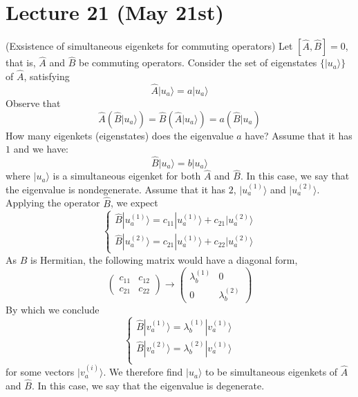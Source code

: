 \section{Lecture 21 (May 21st)}
\begin{thm}
(Exsistence of simultaneous eigenkets for commuting operators) Let $[\hat{A},\hat{B}]=0$, that is, $\hat{A}$ and $\hat{B}$ be commuting operators. Consider the set of eigenstates $\{|u_{a}\rangle \}$ of $\hat{A}$, satisfying
\[\hat{A}|u_{a}\rangle =a|u_{a}\rangle \]
Observe that
\[\hat{A}(\hat{B}|u_{a}\rangle )=\hat{B}(\hat{A}|u_{a}\rangle )=a(\hat{B}|u_{a})\]
How many eigenkets (eigenstates) does the eigenvalue $a$ have? Assume that it has $1$ and we have:
\[\hat{B}|u_{a}\rangle =b|u_{a}\rangle \]
where $|u_{a}\rangle $ is a simultaneous eigenket for both $\hat{A}$ and $\hat{B}$. In this case, we say that the eigenvalue is nondegenerate. Assume that it has $2$, $|u_{a}^{(1)}\rangle $ and $|u_{a}^{(2)}\rangle $. Applying the operator $\hat{B}$, we expect
\[\begin{cases}
\hat{B}|u_{a}^{(1)}\rangle =c_{11}|u_{a}^{(1)}\rangle +c_{21}|u_{a}^{(2)}\rangle \\
\hat{B}|u_{a}^{(2)}\rangle =c_{21}|u_{a}^{(1)}\rangle +c_{22}|u_{a}^{(2)}\rangle 
\end{cases}\]
As $\hat{B}$ is Hermitian, the following matrix would have a diagonal form,
\[\begin{pmatrix}
c_{11}&c_{12}\\c_{21}&c_{22}
\end{pmatrix}\longrightarrow \begin{pmatrix}
\lambda _{b}^{(1)}&0\\0&\lambda ^{(2)}_{b}
\end{pmatrix}
\]
By which we conclude
\[\begin{cases}
\hat{B}|v^{(1)}_{a}\rangle =\lambda _{b}^{(1)}|v_{a}^{(1)}\rangle \\
\hat{B}|v^{(2)}_{a}\rangle =\lambda _{b}^{(2)}|v_{a}^{(1)}\rangle \\
\end{cases}\]
for some vectors $|v_{a}^{(i)}\rangle $. We therefore find $|u_{a}\rangle $ to be simultaneous eigenkets of $\hat{A}$ and $\hat{B}$. In this case, we say that the eigenvalue is degenerate.
\end{thm}
\vspace{2ex}
